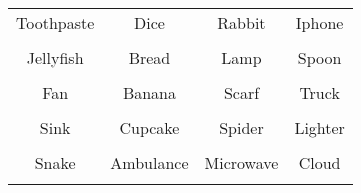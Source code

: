 \documentclass[12pt,a4paper]{article}
\begin{document}
\thispagestyle{empty}
\begin{table}[]
\centering
\Huge
\begin{tabular}{cccc}
 Toothpaste& Dice& Rabbit& Iphone\\  & & & \\
 Jellyfish& Bread& Lamp& Spoon\\  & & & \\
 Fan& Banana& Scarf& Truck\\  & & & \\
 Sink& Cupcake& Spider& Lighter\\  & & & \\
 Snake& Ambulance& Microwave& Cloud\\  & & & \\
\end{tabular}
\end{table}
\end{document}
